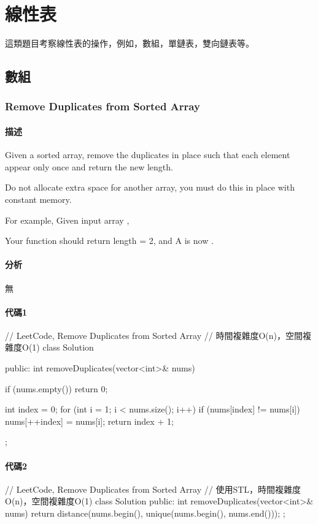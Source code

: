 \chapter{線性表}
這類題目考察線性表的操作，例如，數組，單鏈表，雙向鏈表等。
\newline


\section{數組} %


\subsection{Remove Duplicates from Sorted Array}
\label{sec:remove-duplicates-from-sorted-array}


\subsubsection{描述}
Given a sorted array, remove the duplicates in place such that each element appear only once and return the new length.

Do not allocate extra space for another array, you must do this in place with constant memory.

For example, Given input array ,

Your function should return length = 2, and A is now \code{\[1,2\]}.


\subsubsection{分析}
無


\subsubsection{代碼1}
\begin{Code}
// LeetCode, Remove Duplicates from Sorted Array
// 時間複雜度O(n)，空間複雜度O(1)
class Solution {
public:
    int removeDuplicates(vector<int>& nums) {
        if (nums.empty()) return 0;

        int index = 0;
        for (int i = 1; i < nums.size(); i++) {
            if (nums[index] != nums[i])
                nums[++index] = nums[i];
        }
        return index + 1;
    }
};
\end{Code}


\subsubsection{代碼2}
\begin{Code}
// LeetCode, Remove Duplicates from Sorted Array
// 使用STL，時間複雜度O(n)，空間複雜度O(1)
class Solution {
public:
    int removeDuplicates(vector<int>& nums) {
        return distance(nums.begin(), unique(nums.begin(), nums.end()));
    }
};
\end{Code}


